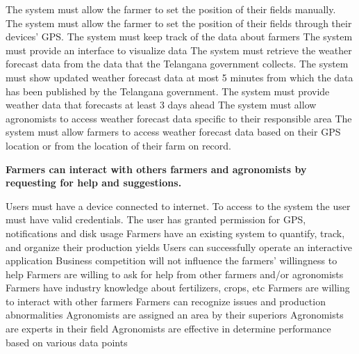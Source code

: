 \begin{itemize}
\begin{itemize}
 The system must allow the farmer to set the position of their fields manually.
 The system must allow the farmer to set the position of their fields through their devices' GPS.
 The system must keep track of the data about farmers
 The system must provide an interface to visualize data
 The system must retrieve the weather forecast data from the data that the Telangana government collects.
 The system must show updated weather forecast data at most 5 minutes from which the data has been published by the Telangana government.
 The system must provide weather data that forecasts at least 3 days ahead
 The system must allow agronomists to access weather forecast data specific to their responsible area
 The system must allow farmers to access weather forecast data based on their GPS location or from the location of their farm on record.

\end{itemize}

 \textbf{Farmers can interact with others farmers and agronomists by requesting for help and suggestions.}

\begin{itemize}
  Users must have a device connected to internet.
 To access to the system the user must have valid credentials.
 The user has granted permission for GPS, notifications and disk usage
 Farmers have an existing system to quantify, track, and organize their production yields
 Users can successfully operate an interactive application
 Business competition will not influence the farmers' willingness to help
 Farmers are willing to ask for help from other farmers and/or agronomists
 Farmers have industry knowledge about fertilizers, crops, etc 
 Farmers are willing to interact with other farmers 
 Farmers can recognize issues and production abnormalities
 Agronomists are assigned an area by their superiors
 Agronomists are experts in their field
 Agronomists are effective in determine performance based on various data points


\end{itemize}
\end{itemize}
